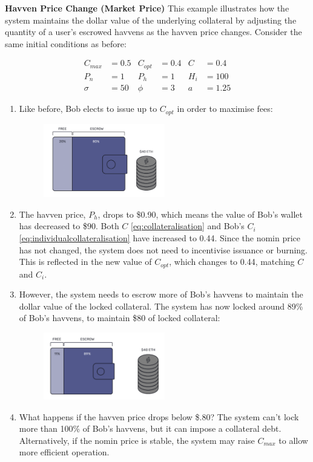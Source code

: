 \newpage

\noindent \textbf{Havven Price Change (Market Price)} This example illustrates how the system maintains the dollar value of the underlying collateral by adjusting the quantity of a user's escrowed havvens as the havven price changes. Consider the same initial conditions as before:

\begin{align*}
C_{max} &= 0.5 & C_{opt} &= 0.4 & C &= 0.4 \\
P_n &= 1 & P_h &= 1 & H_i &= 100 \\
\sigma &= 50 & \phi &= 3 & a&= 1.25
\end{align*}

\begin{enumerate}
\item{Like before, Bob elects to issue up to $C_{opt}$ in order to maximise fees:}
\begin{figure}[h!]
\centering
       \includegraphics[width=0.5\textwidth]{img/escrowed_wallet_new}
\end{figure}
\item{The havven price, $P_h$, drops to \$0.90, which means the value of Bob's wallet has decreased to \$90. Both $C$ \eqref{eq:collateralisation} and Bob's $C_i$ \eqref{eq:individualcollateralisation} have increased to 0.44. Since the nomin price has not changed, the system does not need to incentivise issuance or burning. This is reflected in the new value of $C_{opt}$, which changes to 0.44, matching $C$ and $C_i$. }
\item{However, the system needs to escrow more of Bob's havvens to maintain the dollar value of the locked collateral. The system has now locked around 89\% of Bob's havvens, to maintain \$80 of locked collateral:}
\begin{figure}[h!]
    \centering
      \includegraphics[width=0.5\textwidth]{img/ph_drop_new}
\end{figure}
\item{What happens if the havven price drops below \$.80? The system can't lock more than 100\% of Bob's havvens, but it can impose a collateral debt. Alternatively, if the nomin price is stable, the system may raise $C_{max}$ to allow more efficient operation.} 
\end{enumerate} 

